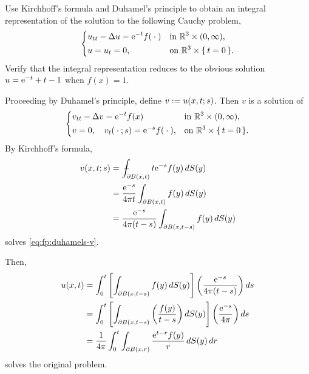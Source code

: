 \begin{problem}
  Use Kirchhoff's formula and Duhamel's principle to obtain an integral
  representation of the solution to the following Cauchy problem,
  \[
    \left\{
      \begin{aligned}
        &u_{tt}-\Delta u=\mathrm{e}^{-t}f({}\cdot{})&&\text{in \(\mathbb{R}^3\times(0,\infty)\),}\\
        &u=u_t=0,&&\text{on \(\mathbb{R}^3\times\{\,t=0\,\}\).}
      \end{aligned}
    \right.
  \]
  Verify that the integral representation reduces to the obvious solution
  \(u=\mathrm{e}^{-t}+t-1\) when \(f(x)=1\).
\end{problem}
\begin{solution*}
  Proceeding by Duhamel's principle, define \(v\defeq u(x,t;s)\). Then
  \(v\) is a solution of
  \begin{equation}
    \label{eq:fp:duhamels-v}
    \left\{
      \begin{aligned}
        &v_{tt}-\Lap v=\rme^{-t}f(x)%
        &&\text{in \(\R^3\times(0,\infty)\),}\\
        &v=0, \quad v_t(\blank;s)=\rme^{-s}f(\blank),%
        &&\text{on \(\R^3\times\{\,t=0\,\}\).}
      \end{aligned}
    \right.
  \end{equation}
  By Kirchhoff's formula,
  \begin{align*}
    v(x,t;s)
    &=\fint_{\partial B(x,t)} t\rme^{-s}f(y)\diff S(y)\\
    &=\frac{\rme^{-s}}{4\pi t}\int_{\partial B(x,t)} f(y)\diff S(y)\\
    &=\frac{\rme^{-s}}{4\pi(t-s)}\int_{\partial B(x,t-s)}f(y)\diff S(y)
  \end{align*}
  solves \eqref{eq:fp:duhamels-v}.

  Then,
  \begin{equation}
    \label{eq:fp:duhamels-sol}
    \begin{aligned}
      u(x,t) &=\int_0^t \left[ \int_{\partial B(x,t-s)}f(y)\diff S(y)
      \right]%
      \left(\frac{\rme^{-s}}{4\pi(t-s)}\right)\diff s\\
      &=\int_0^t \left[%
        \int_{\partial B(x,t-s)}%
        \left(%
          \frac{f(y)}{t-s}%
        \right)%
        \diff S(y) \right]%
      \left(\frac{\rme^{-s}}{4\pi}\right)\diff s\\
      &=\frac{1}{4\pi} \int_0^t\int_{\partial
        B(x,r)}\frac{\rme^{t-r}f(y)}{r}\diff S(y)\diff r
    \end{aligned}
  \end{equation}
  solves the original problem.


\end{solution*}
